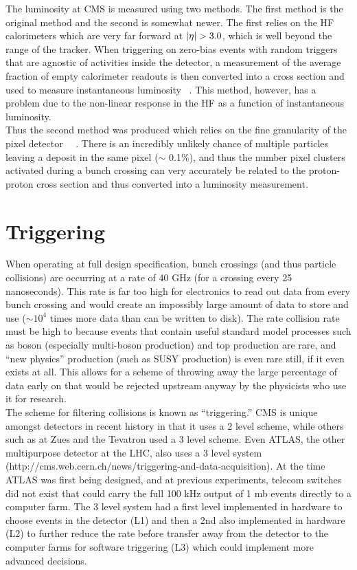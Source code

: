 The luminosity at CMS is measured using two methods. The first method is the original method and the second is somewhat newer. The first relies on the HF calorimeters which are very far forward at $|\eta| > 3.0$, which is well beyond the range of the tracker. When triggering on zero-bias events with random triggers that are agnostic of activities inside the detector, a measurement of the average fraction of empty calorimeter readouts is then converted into a cross section and used to measure instantaneous luminosity ~\cite{see ryans}. This method, however, has a problem due to the non-linear response in the HF as a function of instantaneous luminosity.\\

Thus the second method was produced which relies on the fine granularity of the pixel detector ~\cite{see ryans}~\cite{see ryans}. There is an incredibly unlikely chance of multiple particles leaving a deposit in the same pixel ($\sim$ 0.1\%), and thus the number pixel clusters activated during a bunch crossing can very accurately be related to the proton-proton cross section and thus converted into a luminosity measurement.\\
				
	\section{Triggering}       
	When operating at full design specification, bunch crossings (and thus particle collisions) are occurring at a rate of 40 GHz (for a crossing every 25 nanoseconds). This rate is far too high for electronics to read out data from every bunch crossing and would create an impossibly large amount of data to store and use ($\sim 10^4$ times more data than can be written to disk). The rate collision rate must be high to because events that contain useful standard model processes such as boson (especially multi-boson production) and top production are rare, and ``new physics'' production (such as SUSY production) is even rare still, if it even exists at all. This allows for a scheme of throwing away the large percentage of data early on that would be rejected upstream anyway by the physicists who use it for research.\\
	
	The scheme for filtering collisions is known as ``triggering.'' CMS is unique amongst detectors in recent history in that it uses a 2 level scheme, while others such as at Zues and the Tevatron used a 3 level scheme. Even ATLAS, the other multipurpose detector at the LHC, also uses a 3 level system (http://cms.web.cern.ch/news/triggering-and-data-acquisition). At the time ATLAS was first being designed, and at previous experiments, telecom switches did not exist that could carry the full 100 kHz output of 1 mb events directly to a computer farm. The 3 level system had a first level implemented in hardware to choose events in the detector (L1) and then a 2nd also implemented in hardware (L2) to further reduce the rate before transfer away from the detector to the computer farms for software triggering (L3) which could implement more advanced decisions.\\
	
